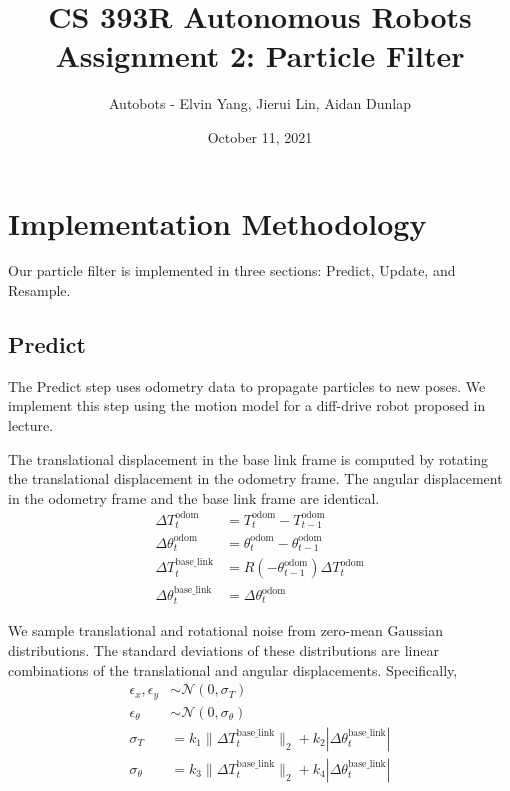 \documentclass[11pt]{article}
\title{CS 393R Autonomous Robots \\ \large Assignment 2: Particle Filter}
\author{Autobots - Elvin Yang, Jierui Lin, Aidan Dunlap}
\date{October 11, 2021}
\begin{document}
\maketitle

\section{Implementation Methodology}

Our particle filter is implemented in three sections: Predict, Update, and Resample.

\subsection{Predict}

\def\odom{\textrm{odom}}
\def\blink{\textrm{base\_link}}

The Predict step uses odometry data to propagate particles to new poses. We
implement this step using the motion model for a diff-drive robot proposed in
lecture.

\bigskip
\noindent
The translational displacement in the base link frame is computed by rotating
the translational displacement in the odometry frame. The angular displacement
in the odometry frame and the base link frame are identical.
\begin{align*}
    \Delta T^{\odom}_t &= T^{\odom}_{t} - T^{\odom}_{t - 1} \\
    \Delta \theta^{\odom}_t
        &= \theta^{\odom}_t - \theta^{\odom}_{t - 1} \\
    \Delta T^{\blink}_{t}
        &= R(-\theta^{\odom}_{t - 1}) \Delta T^{\odom}_{t} \\
    \Delta \theta^{\blink}_t &= \Delta \theta^{\odom}_t
\end{align*}

\noindent
We sample translational and rotational noise from zero-mean Gaussian
distributions. The standard deviations of these distributions are linear
combinations of the translational and angular displacements. Specifically,
\begin{align*}
    \epsilon_x, \epsilon_y &\sim \mathcal{N}(0, \sigma_T) \\
    \epsilon_\theta &\sim \mathcal{N}(0, \sigma_\theta) \\
    \sigma_T
        &= k_1 \| \Delta T^{\blink}_{t} \|_2
            + k_2 | \Delta \theta^{\blink}_t | \\
    \sigma_\theta
        &= k_3 \| \Delta T^{\blink}_{t} \|_2
            + k_4 | \Delta \theta^{\blink}_t |
\end{align*}
\end{document}
